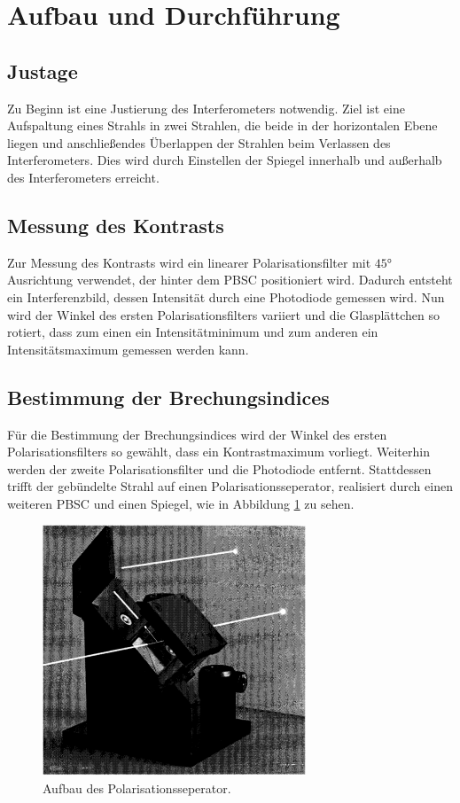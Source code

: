 \section{Aufbau und Durchführung}
\label{sec:Durchführung}

\subsection{Justage}
Zu Beginn ist eine Justierung des Interferometers notwendig.
Ziel ist eine Aufspaltung eines Strahls in zwei Strahlen, die beide in
der horizontalen Ebene liegen und anschließendes Überlappen der Strahlen
beim Verlassen des Interferometers. Dies wird durch Einstellen der
Spiegel innerhalb und außerhalb des Interferometers erreicht.


\subsection{Messung des Kontrasts}
Zur Messung des Kontrasts wird ein linearer Polarisationsfilter mit $45\si{\degree}$
Ausrichtung verwendet, der hinter dem PBSC positioniert wird.
Dadurch entsteht ein Interferenzbild, dessen Intensität durch eine Photodiode gemessen wird.
Nun wird der Winkel des ersten Polarisationsfilters variiert
und die Glasplättchen so rotiert, dass zum einen ein Intensitätminimum und zum anderen
ein Intensitätsmaximum gemessen werden kann.

\subsection{Bestimmung der Brechungsindices}
Für die Bestimmung der Brechungsindices wird der
Winkel des ersten Polarisationsfilters so gewählt, dass ein Kontrastmaximum vorliegt.
Weiterhin werden der zweite Polarisationsfilter und die Photodiode entfernt.
Stattdessen trifft der gebündelte Strahl auf einen Polarisationsseperator, realisiert durch einen
weiteren PBSC und einen Spiegel, wie in Abbildung \ref{fig:polsep} zu sehen.
\begin{figure}
     \centering
     \includegraphics[width=0.7\textwidth]{PSBC.PNG}
     \caption{Aufbau des Polarisationsseperator.\cite{skript}}
     \label{fig:polsep}
\end{figure}

